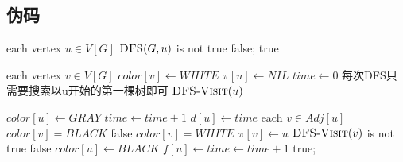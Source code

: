 \documentclass{article}
\begin{document}
\begin{CJK}{UTF8}{gbsn}
\subsection*{伪码}
\begin{codebox}
\li \For each vertex $u \in V[G]$
\li 	\Do \If $\textnormal{\scshape DFS}(G, u)$ is not true
\li				\Then \Return false;
				\End
		\End
\li \Return true
\end{codebox}

\begin{codebox}
\li \For each vertex $v \in V[G]$
\li 	\Do $color[v] \gets WHITE$
\li 		$\pi[u] \gets NIL$
		\End
\li $time \gets 0$
\li \Comment 每次DFS只需要搜索以u开始的第一棵树即可
\li \Return $\textnormal{\scshape DFS-Visit}(u)$
\end{codebox}

\begin{codebox}
\li $color[u] \gets GRAY$
\li $time \gets time + 1$
\li $d[u] \gets time$
\li \For each $v \in Adj[u]$
\li 	\Do 
\li			\If $color[v] = BLACK$
\li				\Then \Return false
				\End
\li			\If $color[v] = WHITE$
\li 			\Then 	$\pi[v] \gets u$
\li 					\If $\textnormal{\scshape DFS-Visit}(v)$ is not true
\li	 						\Then \Return false
							\End
				\End
		\End
\li $color[u] \gets BLACK$
\li $f[u] \gets time \gets time + 1$
\li \Return true;
\end{codebox}

\end{CJK}
\end{document}
